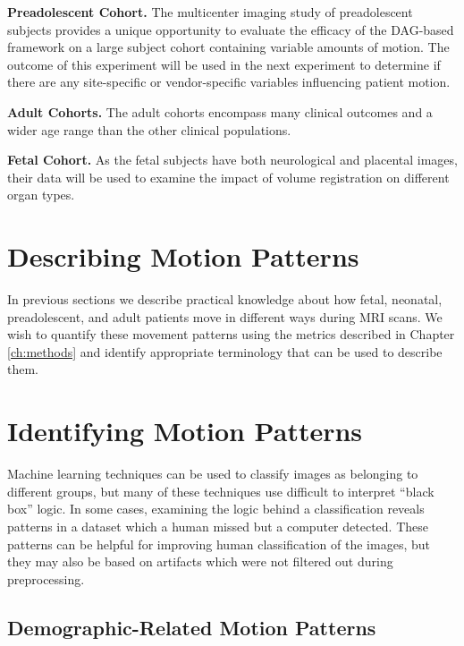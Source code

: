 \textbf{Preadolescent Cohort.} The multicenter imaging study of preadolescent subjects provides a unique opportunity to evaluate the efficacy of the DAG-based framework on a large subject cohort containing variable amounts of motion. The outcome of this experiment will be used in the next experiment to determine if there are any site-specific or vendor-specific variables influencing patient motion.

\textbf{Adult Cohorts.} The adult cohorts encompass many clinical outcomes and a wider age range than the other clinical populations. 

\textbf{Fetal Cohort.} As the fetal subjects have both neurological and placental images, their data will be used to examine the impact of volume registration on different organ types.

\section{Describing Motion Patterns}

In previous sections we describe practical knowledge about how fetal, neonatal, preadolescent, and adult patients move in different ways during MRI scans. We wish to quantify these movement patterns using the metrics described in Chapter \ref{ch:methods} and identify appropriate terminology that can be used to describe them.

\section{Identifying Motion Patterns}

Machine learning techniques can be used to classify images as belonging to different groups, but many of these techniques use difficult to interpret ``black box'' logic. In some cases, examining the logic behind a classification reveals patterns in a dataset which a human missed but a computer detected. These patterns can be helpful for improving human classification of the images, but they may also be based on artifacts which were not filtered out during preprocessing.

\subsection{Demographic-Related Motion Patterns} %


